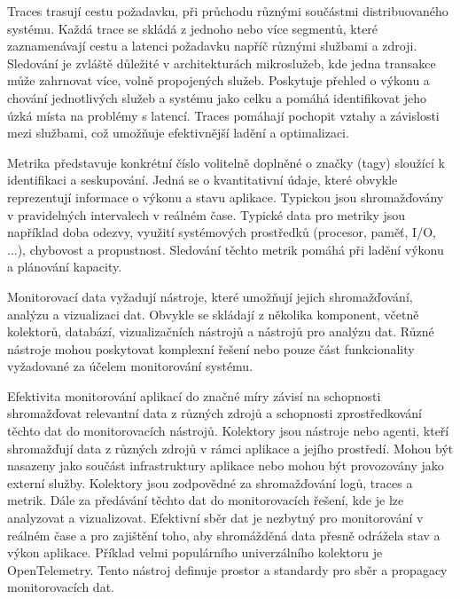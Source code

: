 
Traces trasují cestu požadavku, při průchodu různými součástmi distribuovaného systému. Každá trace se skládá z jednoho nebo více segmentů, které zaznamenávají cestu a latenci požadavku napříč různými službami a zdroji. Sledování je zvláště důležité v architekturách mikroslužeb, kde jedna transakce může zahrnovat více, volně propojených služeb. Poskytuje přehled o výkonu a chování jednotlivých služeb a systému jako celku a pomáhá identifikovat jeho úzká místa na problémy s latencí. Traces pomáhají pochopit vztahy a závislosti mezi službami, což umožňuje efektivnější ladění a optimalizaci. \cite{Molkova2023}


Metrika představuje konkrétní číslo volitelně doplněné o značky (tagy) sloužící k identifikaci a seskupování. \cite{Majors2022} Jedná se o kvantitativní údaje, které obvykle reprezentují informace o výkonu a stavu aplikace. Typickou jsou shromažďovány v pravidelných intervalech v reálném čase. Typické data pro metriky jsou například doba odezvy, využití systémových prostředků (procesor, paměť, I/O, ...), chybovost a propustnost. Sledování těchto metrik pomáhá při ladění výkonu a plánování kapacity.


Monitorovací data vyžadují nástroje, které umožňují jejich shromažďování, analýzu a vizualizaci dat. Obvykle se skládají z několika komponent, včetně kolektorů, databází, vizualizačních nástrojů a nástrojů pro analýzu dat. Různé nástroje mohou poskytovat komplexní řešení nebo pouze část funkcionality vyžadované za účelem monitorování systému. \cite{Riedesel2021}


Efektivita monitorování aplikací do značné míry závisí na schopnosti shromažďovat relevantní data z různých zdrojů a schopnosti zprostředkování těchto dat do monitorovacích nástrojů. Kolektory jsou nástroje nebo agenti, kteří shromažďují data z různých zdrojů v rámci aplikace a jejího prostředí. \cite{Blanco2023} Mohou být nasazeny jako součást infrastruktury aplikace nebo mohou být provozovány jako externí služby. Kolektory jsou zodpovědné za shromažďování logů, traces a metrik. Dále za předávání těchto dat do monitorovacích řešení, kde je lze analyzovat a vizualizovat. Efektivní sběr dat je nezbytný pro monitorování v reálném čase a pro zajištění toho, aby shromážděná data přesně odrážela stav a výkon aplikace. Příklad velmi populárního univerzálního kolektoru je OpenTelemetry. Tento nástroj definuje prostor a standardy pro sběr a propagacy monitorovacích dat. \cite{Blanco2023}

